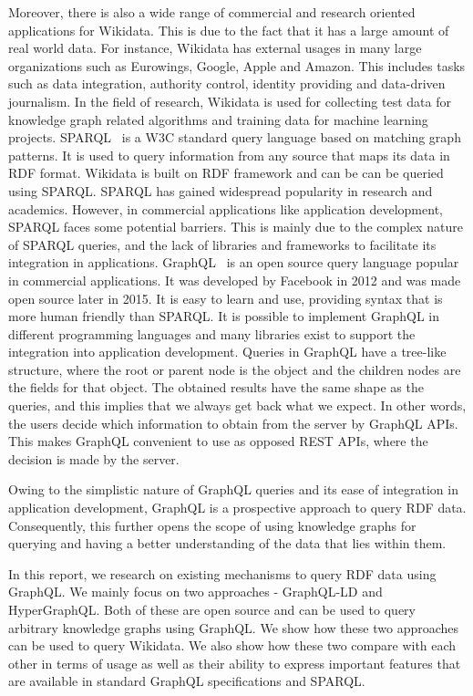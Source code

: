 Moreover, there is also a wide range of commercial and research oriented applications for Wikidata. This is due to the fact that it has a large amount of real world data. For instance, Wikidata has external usages in many large organizations such as Eurowings, Google, Apple and Amazon. This includes tasks such as data integration, authority control, identity providing and data-driven journalism. In the field of research, Wikidata is used for collecting test data for knowledge graph related algorithms and training data for machine learning projects.
SPARQL~\cite{C.B.Aranda2013} is a W3C standard query language based on matching graph patterns. It is used to query information from any source that maps its data in RDF format. Wikidata is built on RDF framework and can be can be queried using SPARQL. SPARQL has gained widespread popularity in research and academics. However, in commercial applications like application development, SPARQL faces some potential barriers. This is mainly due to the complex nature of SPARQL queries, and the lack of libraries and frameworks to facilitate its integration in applications. 
GraphQL~\cite{GraphQLa} is an open source query language popular in commercial applications. It was developed by Facebook in 2012 and was made open source later in 2015. It is easy to learn and use, providing syntax that is more human friendly than SPARQL. It is possible to implement GraphQL in different programming languages and many libraries exist to support the integration into application development. Queries in GraphQL have a tree-like structure, where the root or parent node is the object and the children nodes are the fields for that object. The obtained results have the same shape as the queries, and this implies that we always get back what we expect. In other words, the users decide which information to obtain from the server by GraphQL APIs. This makes GraphQL convenient to use as opposed REST APIs, where the decision is made by the server. 

Owing to the simplistic nature of GraphQL queries and its ease of integration in application development, GraphQL is a prospective approach to query RDF data. Consequently, this further opens the scope of using knowledge graphs for querying and having a better understanding of the data that lies within them.

In this report, we research on existing mechanisms to query RDF data using GraphQL. We mainly focus on two approaches - GraphQL-LD and HyperGraphQL. Both of these are open source and can be used to query arbitrary knowledge graphs using GraphQL. We show how these two approaches can be used to query Wikidata. We also show how these two compare with each other in terms of usage as well as their ability to express important features that are available in standard GraphQL specifications and SPARQL.



